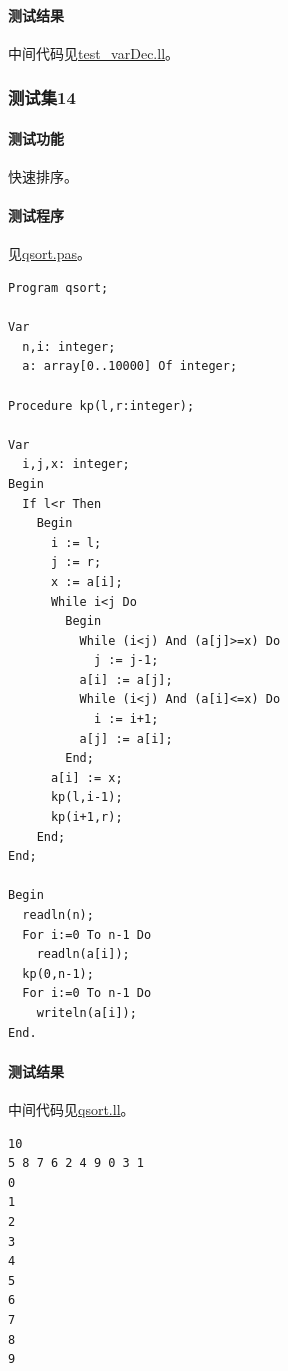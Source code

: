 \documentclass[lang=cn,11pt,a4paper,cite=authornum]{paper}
\begin{document}
\paragraph{测试结果} 中间代码见\href{run:../test/test_varDec.ll}{test\_varDec.ll}。

\subsubsection{测试集14}

\paragraph{测试功能} 快速排序。

\paragraph{测试程序} 见\href{run:../test/qsort.pas}{qsort.pas}。

\begin{code}
    \begin{verbatim}
Program qsort;

Var 
  n,i: integer;
  a: array[0..10000] Of integer;

Procedure kp(l,r:integer);

Var 
  i,j,x: integer;
Begin
  If l<r Then
    Begin
      i := l;
      j := r;
      x := a[i];
      While i<j Do
        Begin
          While (i<j) And (a[j]>=x) Do
            j := j-1;
          a[i] := a[j];
          While (i<j) And (a[i]<=x) Do
            i := i+1;
          a[j] := a[i];
        End;
      a[i] := x;
      kp(l,i-1);
      kp(i+1,r);
    End;
End;

Begin
  readln(n);
  For i:=0 To n-1 Do
    readln(a[i]);
  kp(0,n-1);
  For i:=0 To n-1 Do
    writeln(a[i]);
End.
\end{verbatim}
\end{code}

\paragraph{测试结果} 中间代码见\href{run:../test/qsort.ll}{qsort.ll}。

\begin{code}
    \begin{verbatim}
10
5 8 7 6 2 4 9 0 3 1 
0
1
2
3
4
5
6
7
8
9
\end{verbatim}
\end{code}
\end{document}
